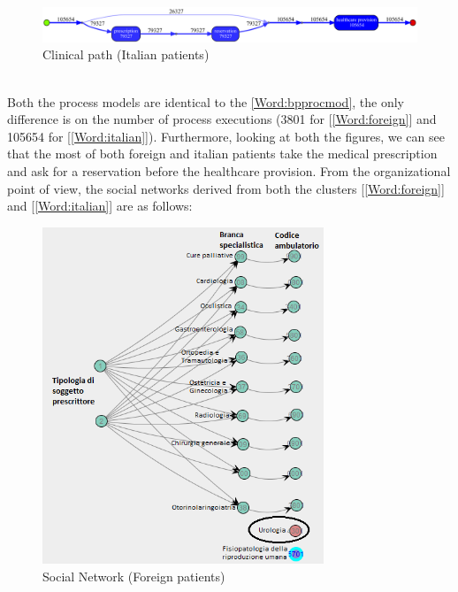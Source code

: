\begin{figure} [htbp]
\includegraphics[width=\textwidth , keepaspectratio]{AmbulatoriInductiveVisualMinerItalians}
\caption{Clinical path (Italian patients)}
\end{figure}\\
Both the process models are identical to the \ref{Word:bpprocmod}, the only difference is on the number of process executions (3801 for [\ref{Word:foreign}] and 105654 for [\ref{Word:italian}]). Furthermore, looking at both the figures, we can see that the most of both foreign and italian patients take the medical prescription and ask for a reservation before the healthcare provision. From the organizational point of view, the social networks derived from both the clusters [\ref{Word:foreign}] and [\ref{Word:italian}] are as follows:
\begin{figure} [htbp]
\includegraphics[width=0.75\textwidth, keepaspectratio]{AmbulatoriSocialNetworkForeigns}
\caption{Social Network (Foreign patients)}
\end{figure}
\clearpage
